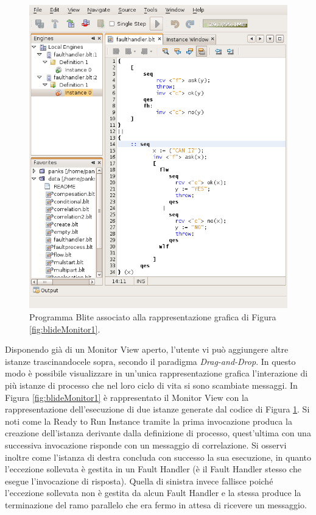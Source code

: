 \begin{figure}[!t]
\begin{center}
\includegraphics[scale=0.79]
{blide/dia/BlideMonitorCode}
\caption[Blide: programma Blite]{Programma Blite associato alla
rappresentazione grafica di Figura \ref{fig:blideMonitor1}.}
  \label{fig:blideMonitorCode}
\end{center}
\end{figure}


Disponendo già di un Monitor View aperto, l'utente vi può aggiungere altre
istanze trascinandocele sopra, secondo il paradigma \emph{Drag-and-Drop}. In
questo modo è possibile visualizzare in un'unica rappresentazione grafica
l'interazione di più istanze di processo che nel loro ciclo di vita si sono
scambiate messaggi. In Figura \ref{fig:blideMonitor1} è rappresentato il
Monitor View con la rappresentazione dell'esecuzione di due istanze generate
dal codice di Figura \ref{fig:blideMonitorCode}. Si noti come la Ready to Run
Instance tramite la prima invocazione produca la creazione dell'istanza
derivante dalla definizione di processo, quest'ultima con una successiva
invocazione risponde con un messaggio di correlazione. Si osservi inoltre come
l'istanza di destra concluda con successo la sua esecuzione, in quanto
l'eccezione sollevata è gestita in un Fault Handler (è il Fault Handler stesso
che esegue l'invocazione di risposta). Quella di sinistra invece fallisce poiché
l'eccezione sollevata non è gestita da alcun Fault Handler e la stessa produce
la terminazione del ramo parallelo che era fermo in attesa di ricevere un
messaggio. 

